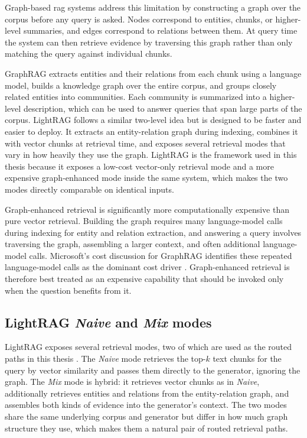 \documentclass[english, bibtex]{kththesis}               %
\numberwithin{listing}{chapter}
\begin{document}
Graph-based \gls{rag} systems address this limitation by constructing a graph over the corpus before any query is asked. Nodes correspond to entities, chunks, or higher-level summaries, and edges correspond to relations between them. At query time the system can then retrieve evidence by traversing this graph rather than only matching the query against individual chunks.

GraphRAG \cite{edge2024graphrag} extracts entities and their relations from each chunk using a language model, builds a knowledge graph over the entire corpus, and groups closely related entities into communities. Each community is summarized into a higher-level description, which can be used to answer queries that span large parts of the corpus. LightRAG \cite{lightrag2024} follows a similar two-level idea but is designed to be faster and easier to deploy. It extracts an entity-relation graph during indexing, combines it with vector chunks at retrieval time, and exposes several retrieval modes that vary in how heavily they use the graph. LightRAG is the framework used in this thesis because it exposes a low-cost vector-only retrieval mode and a more expensive graph-enhanced mode inside the same system, which makes the two modes directly comparable on identical inputs.

Graph-enhanced retrieval is significantly more computationally expensive than pure vector retrieval. Building the graph requires many language-model calls during indexing for entity and relation extraction, and answering a query involves traversing the graph, assembling a larger context, and often additional language-model calls. Microsoft's cost discussion for GraphRAG identifies these repeated language-model calls as the dominant cost driver \cite{edge2024graphrag,microsoft2024graphragcosts}. Graph-enhanced retrieval is therefore best treated as an expensive capability that should be invoked only when the question benefits from it.

\subsection{LightRAG \emph{Naive} and \emph{Mix} modes}
\label{sec:backgroundLightragModes}

LightRAG exposes several retrieval modes, two of which are used as the routed paths in this thesis \cite{lightrag2024}. The \emph{Naive} mode retrieves the top-\(k\) text chunks for the query by vector similarity and passes them directly to the generator, ignoring the graph. The \emph{Mix} mode is hybrid: it retrieves vector chunks as in \emph{Naive}, additionally retrieves entities and relations from the entity-relation graph, and assembles both kinds of evidence into the generator's context. The two modes share the same underlying corpus and generator but differ in how much graph structure they use, which makes them a natural pair of routed retrieval paths.
\end{document}
